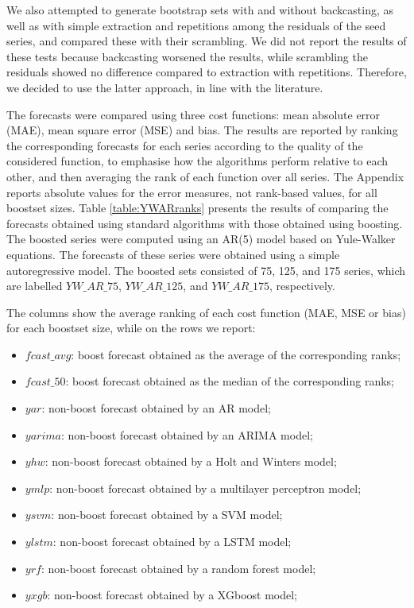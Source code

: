 \documentclass[ijoc,sglanonrev]{informs4}
\begin{document}
We also attempted to generate bootstrap sets with and without backcasting, as well as with simple extraction and repetitions among the residuals of the seed series, and compared these with their scrambling. We did not report the results of these tests because backcasting worsened the results, while scrambling the residuals showed no difference compared to extraction with repetitions. Therefore, we decided to use the latter approach, in line with the literature.

The forecasts were compared using three cost functions: mean absolute error (MAE), mean square error (MSE) and bias. The results are reported by ranking the corresponding forecasts for each series according to the quality of the considered function, to emphasise how the algorithms perform relative to each other, and then averaging the rank of each function over all series. The Appendix reports absolute values for the error measures, not rank-based values, for all boostset sizes. 
Table \ref{table:YWARranks} presents the results of comparing the forecasts obtained using standard algorithms with those obtained using boosting. The boosted series were computed using an AR(5) model based on Yule-Walker equations. The forecasts of these series were obtained using a simple autoregressive model. The boosted sets consisted of 75, 125, and 175 series, which are labelled $YW\_AR\_75$, $YW\_AR\_125$, and $YW\_AR\_175$, respectively.

The columns show the average ranking of each cost function (MAE, MSE or bias) for each boostset size, while on the rows we report:

\begin{itemize}
  \item $fcast\_avg$: boost forecast obtained as the average of the corresponding ranks;
  \item $fcast\_50$: boost forecast obtained as the median of the corresponding ranks;
  \item $yar$: non-boost forecast obtained by an AR model;
  \item $yarima$: non-boost forecast obtained by an ARIMA model;
  \item $yhw$: non-boost forecast obtained by a Holt and Winters model;
  \item $ymlp$: non-boost forecast obtained by a multilayer perceptron model;
  \item $ysvm$: non-boost forecast obtained by a SVM model;
  \item $ylstm$: non-boost forecast obtained by a LSTM model;
  \item $yrf$: non-boost forecast obtained by a random forest model;
  \item $yxgb$: non-boost forecast obtained by a XGboost model;
\end{itemize}
\end{document}
